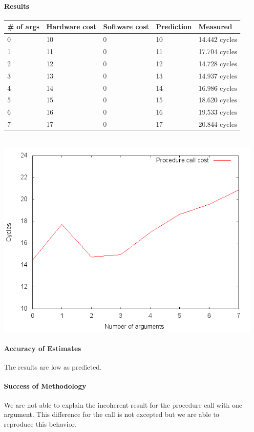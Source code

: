 \paragraph{Results}
\begin{center}
\begin{tabular}{| l | l | l | l | l |}
\hline
\# of args & Hardware cost & Software cost & Prediction & Measured \\ \hline
0 & 10  & 0  & 10  & 14.442 cycles \\ \hline
1 & 11  & 0  & 11  & 17.704 cycles \\ \hline
2 & 12  & 0  & 12  & 14.728 cycles \\ \hline
3 & 13  & 0  & 13  & 14.937 cycles \\ \hline
4 & 14  & 0  & 14  & 16.986 cycles \\ \hline
5 & 15  & 0  & 15  & 18.620 cycles \\ \hline
6 & 16  & 0  & 16  & 19.533 cycles \\ \hline
7 & 17  & 0  & 17  & 20.844 cycles \\ \hline
\end{tabular} \\
\includegraphics[scale=0.5]{procCallImage}
\end{center}


\paragraph{Accuracy of Estimates}
The results are low as predicted.

\paragraph{Success of Methodology}
We are not able to explain the incoherent result for the procedure call with one
argument.
This difference for the call is not excepted but we are able to reproduce this
behavior.

